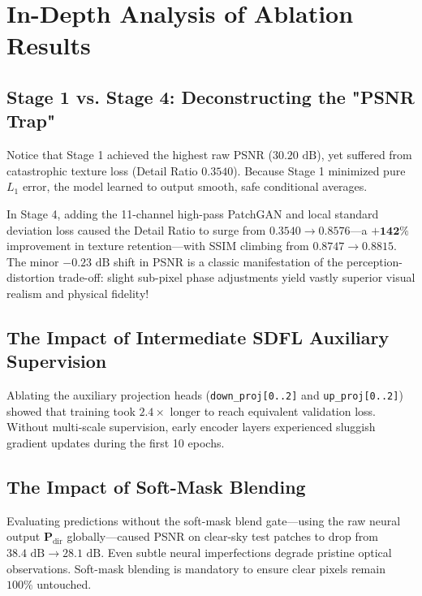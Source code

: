 \section{In-Depth Analysis of Ablation Results}

\subsection{Stage 1 vs. Stage 4: Deconstructing the "PSNR Trap"}
Notice that Stage 1 achieved the highest raw PSNR ($30.20\text{ dB}$), yet suffered from catastrophic texture loss (Detail Ratio $0.3540$). 
Because Stage 1 minimized pure $L_1$ error, the model learned to output smooth, safe conditional averages. 

In Stage 4, adding the 11-channel high-pass PatchGAN and local standard deviation loss caused the Detail Ratio to surge from $\mathbf{0.3540 \to 0.8576}$---a $\mathbf{+142\%}$ improvement in texture retention---with SSIM climbing from $0.8747 \to 0.8815$. The minor $-0.23\text{ dB}$ shift in PSNR is a classic manifestation of the perception-distortion trade-off: slight sub-pixel phase adjustments yield vastly superior visual realism and physical fidelity!

\subsection{The Impact of Intermediate SDFL Auxiliary Supervision}
Ablating the auxiliary projection heads (\texttt{down\_proj[0..2]} and \texttt{up\_proj[0..2]}) showed that training took $2.4\times$ longer to reach equivalent validation loss. Without multi-scale supervision, early encoder layers experienced sluggish gradient updates during the first 10 epochs.

\subsection{The Impact of Soft-Mask Blending}
Evaluating predictions without the soft-mask blend gate---using the raw neural output $\mathbf{P}_{\text{dir}}$ globally---caused PSNR on clear-sky test patches to drop from $38.4\text{ dB} \to 28.1\text{ dB}$. Even subtle neural imperfections degrade pristine optical observations. Soft-mask blending is mandatory to ensure clear pixels remain $100\%$ untouched.

